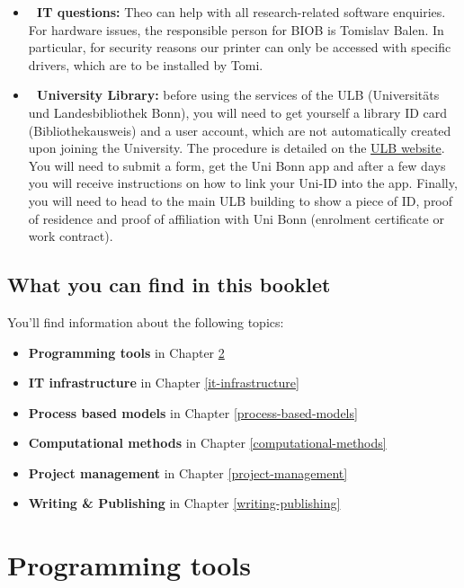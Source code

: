 \documentclass[
]{book}
\begin{document}
\begin{itemize}
\item
  \textbf{🤖 IT questions:} Theo can help with all research-related software
  enquiries. For hardware issues, the responsible person for BIOB is
  Tomislav Balen. In particular, for security reasons our printer can
  only be accessed with specific drivers, which are to be installed by
  Tomi.
\item
  \textbf{📖 University Library:} before using the services of the ULB
  (Universitäts und Landesbibliothek Bonn), you will need to get
  yourself a library ID card (Bibliothekausweis) and a user account,
  which are not automatically created upon joining the University. The
  procedure is detailed on the \href{https://www.ulb.uni-bonn.de/de/nutzung-und-ausleihe/ausweis-konto}{ULB
  website}.
  You will need to submit a form, get the Uni Bonn app and after a few
  days you will receive instructions on how to link your Uni-ID into the
  app. Finally, you will need to head to the main ULB building to show a
  piece of ID, proof of residence and proof of affiliation with Uni Bonn
  (enrolment certificate or work contract).
\end{itemize}

\section{What you can find in this booklet}\label{what-you-can-find-in-this-booklet}

You'll find information about the following topics:

\begin{itemize}
\item
  \textbf{Programming tools} in Chapter \ref{programming-tools}
\item
  \textbf{IT infrastructure} in Chapter \ref{it-infrastructure}
\item
  \textbf{Process based models} in Chapter \ref{process-based-models}
\item
  \textbf{Computational methods} in Chapter \ref{computational-methods}
\item
  \textbf{Project management} in Chapter \ref{project-management}
\item
  \textbf{Writing \& Publishing} in Chapter \ref{writing-publishing}
\end{itemize}

\chapter{Programming tools}\label{programming-tools}
\end{document}
